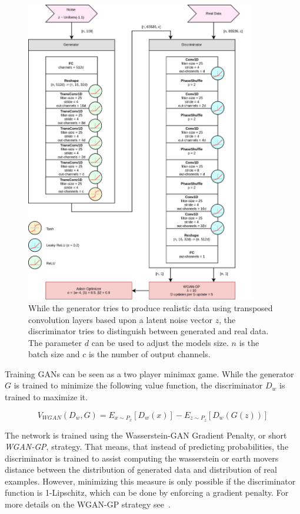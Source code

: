 \documentclass[12pt]{article}
\begin{document}
\begin{figure}
\includegraphics[width=0.9\textwidth]{img/wavegan-arch.png}
\caption{While the generator tries to produce realistic data using transposed convolution layers based upon a latent noise vector $z$, the discriminator tries to distinguish between generated and real data. The parameter $d$ can be used to adjust the models size. $n$ is the batch size and $c$ is the number of output channels.}
\label{fig:WaveGan-arch}
\end{figure}

Training GANs can be seen as a two player minimax game. 
While the generator $G$ is trained to minimize the following value function, the discriminator $D_w$ is trained to maximize it.

$$
V_{WGAN}(D_w, G) = E_{x \sim P_x}[D_w(x)] - E_{z \sim P_z}[D_w(G(z))]
$$

The network is trained using the Wasserstein-GAN Gradient Penalty, or short \emph{WGAN-GP}, strategy.
That means, that instead of predicting probabilities, the discriminator is trained to assist computing the wasserstein or earth movers distance between the distribution of generated data and distribution of real examples.
However, minimizing this measure is only possible if the discriminator function is 1-Lipschitz, which can be done by enforcing a gradient penalty.
For more details on the WGAN-GP strategy see~\cite{gulrajani2017improved}.
\end{document}
